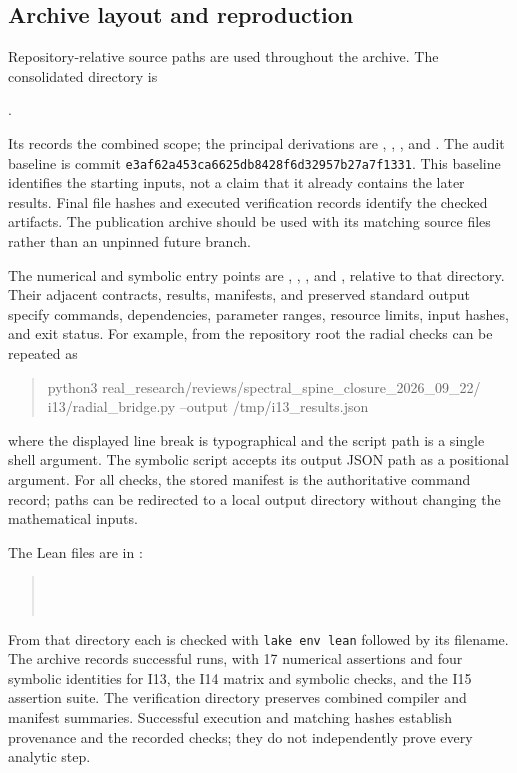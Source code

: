 \documentclass[11pt,letterpaper]{article}
\theoremstyle{definition}
\numberwithin{equation}{section}
\begin{document}
\subsection{Archive layout and reproduction}

Repository-relative source paths are used throughout the archive. The
consolidated directory is
\begin{center}\small
{}.
\end{center}
Its  records the combined scope; the principal derivations
are , ,
, and . The audit baseline
is commit \texttt{e3af62a453ca6625db8428f6d32957b27a7f1331}.
This baseline identifies the starting inputs, not a claim that it already
contains the later results. Final file hashes and executed verification
records identify the checked artifacts. The publication archive should be
used with its matching source files rather than an unpinned future branch.

The numerical and symbolic entry points are
, ,
, and , relative to that
directory. Their adjacent contracts, results, manifests, and preserved
standard output specify commands, dependencies, parameter ranges,
resource limits, input hashes, and exit status. For example, from the
repository root the radial checks can be repeated as
\begin{quote}\small\ttfamily
python3 real\_research/reviews/spectral\_spine\_closure\_2026\_09\_22/\\
\hspace*{1em}i13/radial\_bridge.py --output /tmp/i13\_results.json
\end{quote}
where the displayed line break is typographical and the script path is a
single shell argument. The symbolic script accepts its output JSON path
as a positional argument. For all checks, the stored manifest is the
authoritative command record; paths can be redirected to a local output
directory without changing the mathematical inputs.

The Lean files are in :
\begin{quote}\small
{}\\
\\
\end{quote}
From that directory each is checked with
\texttt{lake env lean} followed by its filename. The archive records
successful runs, with 17 numerical assertions and four symbolic identities
for I13, the I14 matrix and symbolic checks, and the I15 assertion suite.
The verification directory preserves combined compiler and manifest
summaries. Successful execution and matching hashes establish provenance
and the recorded checks; they do not independently prove every analytic
step.
\end{document}

